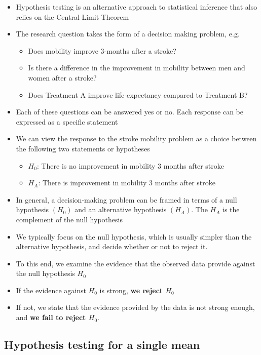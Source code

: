 \documentclass[
]{book}
\providecommand{\tightlist}{%
  \setlength{\itemsep}{0pt}\setlength{\parskip}{0pt}}
\begin{document}
\begin{itemize}
\tightlist
\item
  Hypothesis testing is an alternative approach to statistical inference that also relies on the Central Limit Theorem
\item
  The research question takes the form of a decision making problem, e.g.~

  \begin{itemize}
  \tightlist
  \item
    Does mobility improve 3-months after a stroke?
  \item
    Is there a difference in the improvement in mobility between men and women after a stroke?
  \item
    Does Treatment A improve life-expectancy compared to Treatment B?
  \end{itemize}
\item
  Each of these questions can be answered yes or no. Each response can be expressed as a specific statement
\item
  We can view the response to the stroke mobility problem as a choice between the following two statements or hypotheses

  \begin{itemize}
  \tightlist
  \item
    \(H_0\): There is no improvement in mobility 3 months after stroke
  \item
    \(H_A\): There is improvement in mobility 3 months after stroke
  \end{itemize}
\item
  In general, a decision-making problem can be framed in terms of a null hypothesis \((H_0)\) and an alternative hypothesis \((H_A)\). The \(H_A\) is the complement of the null hypothesis
\item
  We typically focus on the null hypothesis, which is usually simpler than the alternative hypothesis, and decide whether or not to reject it.
\item
  To this end, we examine the evidence that the observed data provide against the null hypothesis \(H_0\)
\item
  If the evidence against \(H_0\) is strong, \textbf{we reject \(H_0\)}
\item
  If not, we state that the evidence provided by the data is not strong enough, and \textbf{we fail to reject \(H_0\)}.
\end{itemize}

\hypertarget{hypothesis-testing-for-a-single-mean}{%
\subsection{Hypothesis testing for a single mean}\label{hypothesis-testing-for-a-single-mean}}
\end{document}
